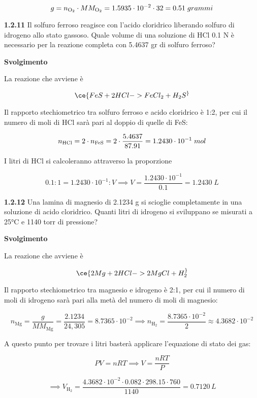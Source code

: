 $$g=n_{\rm O_2} \cdot MM_{\rm O_2}
=1.5935 \cdot 10^{-2} \cdot 32=0.51\;grammi$$

\vspace{0.2cm}\textbf{1.2.11} Il solfuro ferroso reagisce con l'acido cloridrico liberando solfuro di idrogeno allo stato gassoso. Quale volume di una soluzione di HCl 0.1 N è necessario per la reazione completa con 5.4637 gr di solfuro ferroso?

\vspace{0.2cm}\large\textbf{Svolgimento}\normalsize

\vspace{0.2cm}La reazione che avviene è

$$\ce{FeS + 2HCl -> FeCl_2 + H_2S ^}$$

Il rapporto stechiometrico tra solfuro ferroso e acido cloridrico è 1:2, per cui il numero di moli di HCl sarà pari al doppio di quelle di FeS:

$$n_{\rm HCl}=2 \cdot n_{\rm FeS}=2 \cdot \frac{5.4637}{87.91}=1.2430 \cdot 10^{-1}\;mol$$

I litri di HCl si calcoleranno attraverso la proporzione

$$0.1:1=1.2430 \cdot 10^{-1}:V
\implies
V=\frac{1.2430 \cdot 10^{-1}}{0.1}=1.2430\;L$$

\vspace{0.2cm}\textbf{1.2.12} Una lamina di magnesio di 2.1234 g si scioglie completamente in una soluzione di acido cloridrico. Quanti litri di idrogeno si sviluppano se misurati a 25°C e 1140 torr di pressione?

\vspace{0.2cm}\large\textbf{Svolgimento}\normalsize

\vspace{0.2cm}La reazione che avviene è

$$\ce{2Mg + 2HCl -> 2MgCl + H_2 ^}$$

Il rapporto stechiometrico tra magnesio e idrogeno è 2:1, per cui il numero di moli di idrogeno sarà pari alla metà del numero di moli di magnesio:

$$n_{\text{Mg}}=\frac{g}{MM_{\text{Mg}}}=\frac{2.1234}{24,305}=8.7365 \cdot 10^{-2} \implies n_{\text{H}_2}=\frac{8.7365 \cdot 10^{-2}}{2}\approx 4.3682 \cdot 10^{-2}$$

A questo punto per trovare i litri basterà applicare l'equazione di stato dei gas:

$$PV=nRT \implies V=\frac{nRT}{P}$$

$$\implies V_{\text{H}_2}=\frac{4.3682 \cdot 10^{-2} \cdot 0.082 \cdot 298.15 \cdot 760}{1140}=0.7120\,L$$

